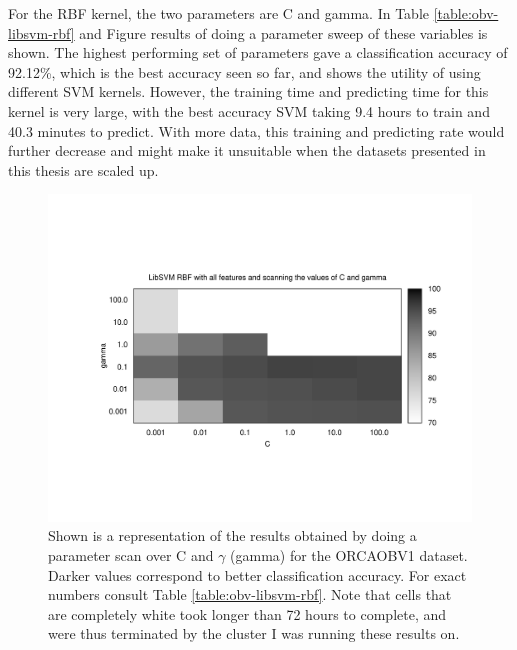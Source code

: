 For the RBF kernel, the two parameters are C and gamma.  In Table
\ref{table:obv-libsvm-rbf} and
Figure \label{fig:gnuplot-obv-libsvm-rbf} results of doing a parameter
sweep of these variables is shown.  The highest performing set of
parameters gave a classification accuracy of 92.12\%, which is the
best accuracy seen so far, and shows the utility of using different
SVM kernels.  However, the training time and predicting time for this
kernel is very large, with the best accuracy SVM taking 9.4 hours to
train and 40.3 minutes to predict.  With more data, this training and
predicting rate would further decrease and might make it unsuitable
when the datasets presented in this thesis are scaled up.

\begin{figure}[t]
\centering
\includegraphics[width=\columnwidth]{figures/gnuplot-obv-libsvm-rbf}
\caption{Shown is a representation of the results obtained by doing a
  parameter scan over C and $\gamma$ (gamma) for the ORCAOBV1 dataset.
  Darker values correspond to better classification accuracy.  For
  exact numbers consult Table \ref{table:obv-libsvm-rbf}.
  Note that cells that are completely white took longer than 72
  hours to complete, and were thus terminated by the cluster I was
  running these results on.}
\label{fig:gnuplot-obv-libsvm-rbf}
\end{figure}


